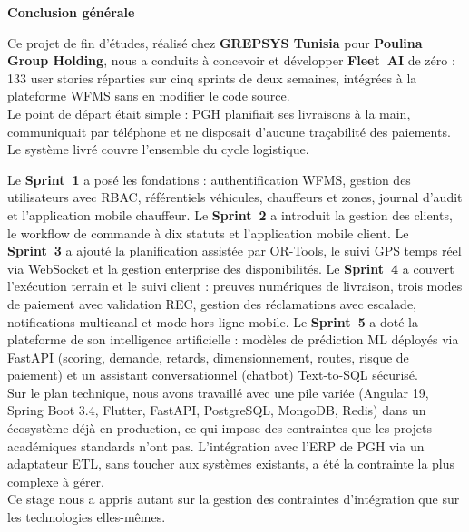 \newpage
\vspace*{0.6\baselineskip}
\begin{center}
  {\Huge\bfseries Conclusion générale}
\end{center}
\vspace{1.5cm}

Ce projet de fin d'études, réalisé chez \textbf{GREPSYS Tunisia} pour \textbf{Poulina Group Holding}, nous a conduits à concevoir et développer \textbf{Fleet~AI} de zéro : 133 user stories réparties sur cinq sprints de deux semaines, intégrées à la plateforme WFMS sans en modifier le code source.\\

Le point de départ était simple : PGH planifiait ses livraisons à la main, communiquait par téléphone et ne disposait d'aucune traçabilité des paiements. Le système livré couvre l'ensemble du cycle logistique.

Le \textbf{Sprint~1} a posé les fondations : authentification WFMS, gestion des utilisateurs avec RBAC, référentiels véhicules, chauffeurs et zones, journal d'audit et l'application mobile chauffeur. Le \textbf{Sprint~2} a introduit la gestion des clients, le workflow de commande à dix statuts et l'application mobile client. Le \textbf{Sprint~3} a ajouté la planification assistée par OR-Tools, le suivi GPS temps réel via WebSocket et la gestion enterprise des disponibilités. Le \textbf{Sprint~4} a couvert l'exécution terrain et le suivi client : preuves numériques de livraison, trois modes de paiement avec validation REC, gestion des réclamations avec escalade, notifications multicanal et mode hors ligne mobile. Le \textbf{Sprint~5} a doté la plateforme de son intelligence artificielle : modèles de prédiction ML déployés via FastAPI (scoring, demande, retards, dimensionnement, routes, risque de paiement) et un assistant conversationnel (chatbot) Text-to-SQL sécurisé.\\

Sur le plan technique, nous avons travaillé avec une pile variée (Angular 19, Spring Boot 3.4, Flutter, FastAPI, PostgreSQL, MongoDB, Redis) dans un écosystème déjà en production, ce qui impose des contraintes que les projets académiques standards n'ont pas. L'intégration avec l'ERP de PGH via un adaptateur ETL, sans toucher aux systèmes existants, a été la contrainte la plus complexe à gérer.\\

Ce stage nous a appris autant sur la gestion des contraintes d'intégration que sur les technologies elles-mêmes.

